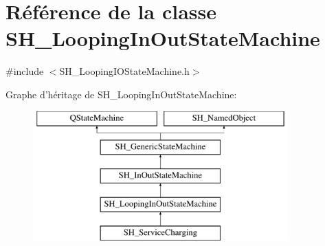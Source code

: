 \hypertarget{classSH__LoopingInOutStateMachine}{\section{Référence de la classe S\-H\-\_\-\-Looping\-In\-Out\-State\-Machine}
\label{classSH__LoopingInOutStateMachine}
}


{\ttfamily \#include $<$S\-H\-\_\-\-Looping\-I\-O\-State\-Machine.\-h$>$}

Graphe d'héritage de S\-H\-\_\-\-Looping\-In\-Out\-State\-Machine\-:\begin{figure}[H]
\begin{center}
\leavevmode
\includegraphics[height=5.000000cm]{classSH__LoopingInOutStateMachine}
\end{center}
\end{figure}
